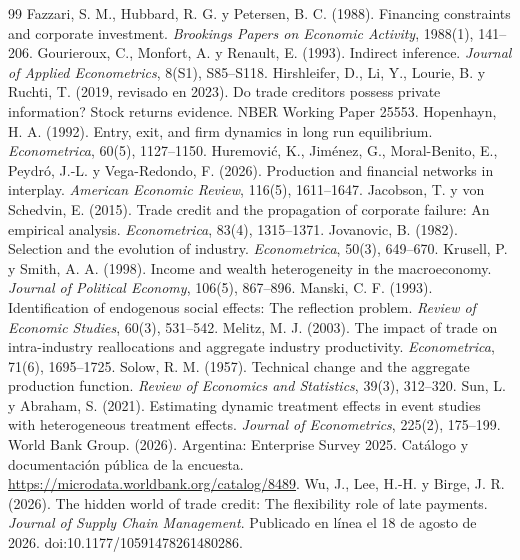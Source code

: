 \documentclass[11pt,a4paper]{article}
\begin{document}
\begin{thebibliography}{99}
 Fazzari, S. M., Hubbard, R. G. y Petersen, B. C. (1988). Financing constraints and corporate investment. \emph{Brookings Papers on Economic Activity}, 1988(1), 141--206.
 Gourieroux, C., Monfort, A. y Renault, E. (1993). Indirect inference. \emph{Journal of Applied Econometrics}, 8(S1), S85--S118.
 Hirshleifer, D., Li, Y., Lourie, B. y Ruchti, T. (2019, revisado en 2023). Do trade creditors possess private information? Stock returns evidence. NBER Working Paper 25553.
 Hopenhayn, H. A. (1992). Entry, exit, and firm dynamics in long run equilibrium. \emph{Econometrica}, 60(5), 1127--1150.
 Huremović, K., Jiménez, G., Moral-Benito, E., Peydró, J.-L. y Vega-Redondo, F. (2026). Production and financial networks in interplay. \emph{American Economic Review}, 116(5), 1611--1647.
 Jacobson, T. y von Schedvin, E. (2015). Trade credit and the propagation of corporate failure: An empirical analysis. \emph{Econometrica}, 83(4), 1315--1371.
 Jovanovic, B. (1982). Selection and the evolution of industry. \emph{Econometrica}, 50(3), 649--670.
 Krusell, P. y Smith, A. A. (1998). Income and wealth heterogeneity in the macroeconomy. \emph{Journal of Political Economy}, 106(5), 867--896.
 Manski, C. F. (1993). Identification of endogenous social effects: The reflection problem. \emph{Review of Economic Studies}, 60(3), 531--542.
 Melitz, M. J. (2003). The impact of trade on intra-industry reallocations and aggregate industry productivity. \emph{Econometrica}, 71(6), 1695--1725.
 Solow, R. M. (1957). Technical change and the aggregate production function. \emph{Review of Economics and Statistics}, 39(3), 312--320.
 Sun, L. y Abraham, S. (2021). Estimating dynamic treatment effects in event studies with heterogeneous treatment effects. \emph{Journal of Econometrics}, 225(2), 175--199.
 World Bank Group. (2026). Argentina: Enterprise Survey 2025. Catálogo y documentación pública de la encuesta. \url{https://microdata.worldbank.org/catalog/8489}.
 Wu, J., Lee, H.-H. y Birge, J. R. (2026). The hidden world of trade credit: The flexibility role of late payments. \emph{Journal of Supply Chain Management}. Publicado en línea el 18 de agosto de 2026. doi:10.1177/10591478261480286.
\end{thebibliography}
\end{document}
